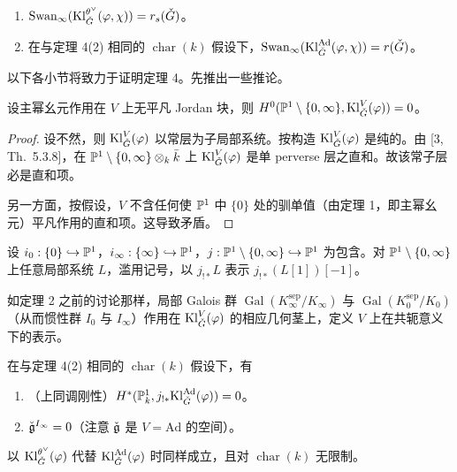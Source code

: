 \begin{corollary}
\begin{enumerate}[label=(\arabic*), leftmargin=1.9em, itemsep=.2em]
\item $\mathrm{Swan}_\infty(\mathrm{Kl}^{\theta^\vee}_{\check G}(\varphi,\chi))=r_s(\check G)$。
\item 在与定理 4(2) 相同的 $\operatorname{char}(k)$ 假设下，$\mathrm{Swan}_\infty(\mathrm{Kl}^{\mathrm{Ad}}_{\check G}(\varphi,\chi))=r(\check G)$。
\end{enumerate}
\end{corollary}

以下各小节将致力于证明定理 4。先推出一些推论。

\begin{lemma}
设主幂幺元作用在 $V$ 上无平凡 Jordan 块，则 $H^0(\mathbb{P}^1\setminus\{0,\infty\},\mathrm{Kl}^V_{\check G}(\varphi))=0$。
\end{lemma}

\begin{proof}
设不然，则 $\mathrm{Kl}^V_{\check G}(\varphi)$ 以常层为子局部系统。按构造 $\mathrm{Kl}^V_{\check G}(\varphi)$ 是纯的。由 [3, Th.~5.3.8]，在 $\mathbb{P}^1\setminus\{0,\infty\}\otimes_k\bar k$ 上 $\mathrm{Kl}^V_{\check G}(\varphi)$ 是单 perverse 层之直和。故该常子层必是直和项。

另一方面，按假设，$V$ 不含任何使 $\mathbb{P}^1$ 中 $\{0\}$ 处的驯单值（由定理 1，即主幂幺元）平凡作用的直和项。这导致矛盾。
\end{proof}

设 $i_0:\{0\}\hookrightarrow\mathbb{P}^1$，$i_\infty:\{\infty\}\hookrightarrow\mathbb{P}^1$，$j:\mathbb{P}^1\setminus\{0,\infty\}\hookrightarrow\mathbb{P}^1$ 为包含。对 $\mathbb{P}^1\setminus\{0,\infty\}$ 上任意局部系统 $L$，滥用记号，以 $j_{!*}L$ 表示 $j_{!*}(L[1])[-1]$。

如定理 2 之前的讨论那样，局部 Galois 群 $\operatorname{Gal}(K^{\mathrm{sep}}_\infty/K_\infty)$ 与 $\operatorname{Gal}(K^{\mathrm{sep}}_0/K_0)$（从而惯性群 $I_0$ 与 $I_\infty$）作用在 $\mathrm{Kl}^V_{\check G}(\varphi)$ 的相应几何茎上，定义 $V$ 上在共轭意义下的表示。

\begin{proposition}
在与定理 4(2) 相同的 $\operatorname{char}(k)$ 假设下，有
\begin{enumerate}[label=(\arabic*), leftmargin=1.9em, itemsep=.2em]
\item （上同调刚性）$H^*(\mathbb{P}^1_k,j_{!*}\mathrm{Kl}^{\mathrm{Ad}}_{\check G}(\varphi))=0$。
\item $\check{\mathfrak g}^{I_\infty}=0$（注意 $\check{\mathfrak g}$ 是 $V=\mathrm{Ad}$ 的空间）。
\end{enumerate}
以 $\mathrm{Kl}^{\theta^\vee}_{\check G}(\varphi)$ 代替 $\mathrm{Kl}^{\mathrm{Ad}}_{\check G}(\varphi)$ 时同样成立，且对 $\operatorname{char}(k)$ 无限制。
\end{proposition}


